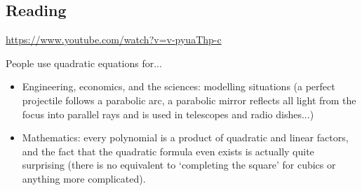 



\subsection*{Reading}
\begin{center}
\begin{tcolorbox}[width=0.8\textwidth,colback={white},title={\textbf{Go and watch...}},colbacktitle=black,coltitle=white]
  \textcolor{black}{\url{https://www.youtube.com/watch?v=v-pyuaThp-c}}
\end{tcolorbox}
\end{center}

\begin{center}
\begin{tcolorbox}[width=0.8\textwidth,colback={white},title={\textbf{What's it good for?}},colbacktitle=MidnightBlue,coltitle=white]
  People use quadratic equations for...
  \begin{itemize}
    \item Engineering, economics, and the sciences: modelling situations (a perfect projectile follows a parabolic arc, a parabolic mirror
          reflects all light from the focus into parallel rays and is used in telescopes and radio dishes...)
    \item Mathematics: every polynomial is a product of quadratic and linear factors, and the fact that the quadratic formula even exists
          is actually quite surprising (there is no equivalent to `completing the square' for cubics or anything more complicated).
  \end{itemize}
\end{tcolorbox}
\end{center}

